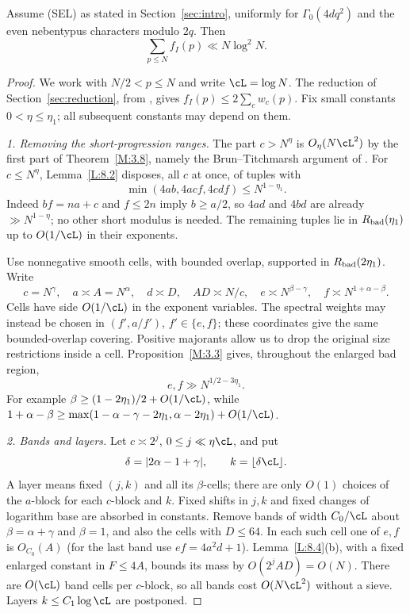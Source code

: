 \begin{theorem}\label{L:8.1}
Assume \textup{(SEL)} as stated in Section~\ref{sec:intro}, uniformly for
$\Gamma_0(4dq^2)$ and the even nebentypus characters modulo $2q$.
Then
\[
 \sum_{p\leq N}f_I(p)\ll N\log^2N.
\]
\end{theorem}
\begin{proof}
We work with $N/2<p\leq N$ and write $\cL=\log N$.
The reduction of Section~\ref{sec:reduction}, from
\cite[Proposition~2.2 and Lemma~2.8]{ET}, gives
$f_I(p)\leq2\sum_cw_c(p)$.  Fix small constants
$0<\eta\leq\eta_1$; all subsequent constants may depend on them.

\smallskip\noindent
\emph{1. Removing the short-progression ranges.}
The part $c>N^\eta$ is $O_\eta(N\cL^2)$ by the first part of
Theorem~\ref{M:3.8}, namely the Brun--Titchmarsh argument of
\cite[(8.1)--(8.2)]{ET}.  For $c\leq N^\eta$, Lemma~\ref{L:8.2}
disposes, all $c$ at once, of tuples with
\[
 \min(4ab,4acf,4cdf)\leq N^{1-\eta_1}.
\]
Indeed $bf=na+c$ and $f\leq2n$ imply $b\geq a/2$, so $4ad$ and
$4bd$ are already $\gg N^{1-\eta}$; no other short modulus is needed.
The remaining tuples lie in $R_{\rm bad}(\eta_1)$ up to
$O(1/\cL)$ in their exponents.

Use nonnegative smooth cells, with bounded overlap, supported in
$R_{\rm bad}(2\eta_1)$.  Write
\begin{equation}\label{C:eq:cell-scales}
 c=N^\gamma,\quad a\asymp A=N^\alpha,\quad
 d\asymp D,\quad AD\asymp N/c,\quad
 e\asymp N^{\beta-\gamma},\quad f\asymp N^{1+\alpha-\beta}.
\end{equation}
Cells have side $O(1/\cL)$ in the exponent variables.  The spectral
weights may instead be chosen in $(f',a/f')$, $f'\in\{e,f\}$;
these coordinates give the same bounded-overlap covering.  Positive
majorants allow us to drop the original size restrictions inside a cell.
Proposition~\ref{M:3.3} gives, throughout the enlarged bad region,
\begin{equation}\label{C:eq:large-divisors}
 e,f\gg N^{1/2-3\eta_1}.
\end{equation}
For example $\beta\geq(1-2\eta_1)/2+O(1/\cL)$, while
$1+\alpha-\beta\geq
\max(1-\alpha-\gamma-2\eta_1,\alpha-2\eta_1)+O(1/\cL)$.

\smallskip\noindent
\emph{2. Bands and layers.}
Let $c\asymp2^j$, $0\leq j\ll\eta\cL$, and put
\[
 \delta=|2\alpha-1+\gamma|,\qquad k=\lfloor\delta\cL\rfloor.
\]
A layer means fixed $(j,k)$ and all its $\beta$-cells; there are only
$O(1)$ choices of the $a$-block for each $c$-block and $k$.
Fixed shifts in $j,k$ and fixed changes of logarithm base are absorbed
in constants.  Remove bands of width $C_0/\cL$ about
$\beta=\alpha+\gamma$ and $\beta=1$, and also the cells with $D\leq64$.
In each such cell one of $e,f$ is $O_{C_0}(A)$ (for the last band use
$ef=4a^2d+1$).  Lemma~\ref{L:8.4}(b), with a fixed enlarged constant
in $F\leq4A$, bounds its mass by $O(2^jAD)=O(N)$.
There are $O(\cL)$ band cells per $c$-block, so all bands cost
$O(N\cL^2)$ without a sieve.  Layers $k\leq C_1\log\cL$ are postponed.


\end{proof}
